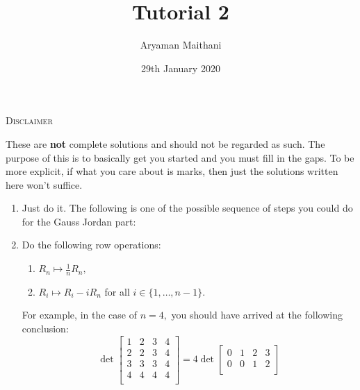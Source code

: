 \documentclass{article}
\title{Tutorial 2}				%
\author{Aryaman Maithani}%
\date{29th January 2020}		%
\begin{document}
\maketitle

\hrulefill

\begin{center}
	\textsc{Disclaimer}
\end{center}
These are \textbf{not} complete solutions and should not be regarded as such. The purpose of this is to basically get you started and you must fill in the gaps. To be more explicit, if what you care about is marks, then just the solutions written here won't suffice.

\hrulefill

\begin{enumerate} 
	\item Just do it. The following is one of the possible sequence of steps you could do for the Gauss Jordan part:
	\item Do the following row operations:
	\begin{enumerate}[nosep] 
		\item $R_n \mapsto \frac{1}{n}R_n,$
		\item $R_i \mapsto R_i - iR_n$ for all $i \in \{1, \ldots, n - 1\}.$
	\end{enumerate}
	For example, in the case of $n = 4,$ you should have arrived at the following conclusion:
	\[\det \begin{bmatrix}
		1 & 2 & 3 & 4\\
		2 & 2 & 3 & 4\\
		3 & 3 & 3 & 4\\
		4 & 4 & 4 & 4\\
	\end{bmatrix}
	= 
	4\det \begin{bmatrix}
		0 & 1 & 2 & 3\\
		0 & 0 & 1 & 2\\

\end{bmatrix}\]
\end{enumerate}
\end{document}
